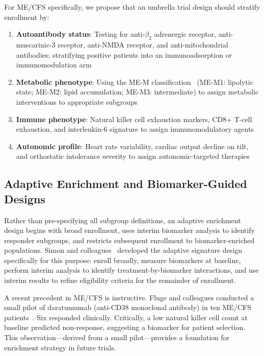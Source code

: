 For ME/CFS specifically, we propose that an umbrella trial design should stratify enrollment by:
\begin{enumerate}
    \item \textbf{Autoantibody status}: Testing for anti-$\beta_2$ adrenergic receptor, anti-muscarinic-3 receptor, anti-NMDA receptor, and anti-mitochondrial antibodies; stratifying positive patients into an immunoadsorption or immunomodulation arm
    \item \textbf{Metabolic phenotype}: Using the ME-M classification~\cite{Germain2020metabolic} (ME-M1: lipolytic state; ME-M2: lipid accumulation; ME-M3: intermediate) to assign metabolic interventions to appropriate subgroups
    \item \textbf{Immune phenotype}: Natural killer cell exhaustion markers, CD8+ T-cell exhaustion, and interleukin-6 signature to assign immunomodulatory agents
    \item \textbf{Autonomic profile}: Heart rate variability, cardiac output decline on tilt, and orthostatic intolerance severity to assign autonomic-targeted therapies
\end{enumerate}

\subsection{Adaptive Enrichment and Biomarker-Guided Designs}

Rather than pre-specifying all subgroup definitions, an adaptive enrichment design begins with broad enrollment, uses interim biomarker analysis to identify responder subgroups, and restricts subsequent enrollment to biomarker-enriched populations. Simon and colleagues~\cite{Simon2013} developed the adaptive signature design specifically for this purpose: enroll broadly, measure biomarkers at baseline, perform interim analysis to identify treatment-by-biomarker interactions, and use interim results to refine eligibility criteria for the remainder of enrollment.

A recent precedent in ME/CFS is instructive. Fluge and colleagues conducted a small pilot of daratumumab (anti-CD38 monoclonal antibody) in ten ME/CFS patients~\cite{Fluge2025daratumumab}. Six responded clinically. Critically, a low natural killer cell count at baseline predicted non-response, suggesting a biomarker for patient selection. This observation---derived from a small pilot---provides a foundation for enrichment strategy in future trials.


